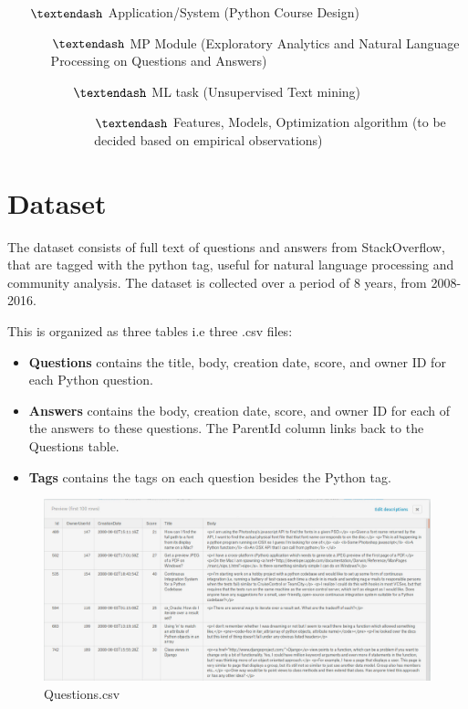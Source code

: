 \documentclass{article}
\begin{document}
\begin{itemize}
\item[$\textendash$] Application/System (Python Course Design)
\begin{itemize}
\item [$\textendash$] MP Module (Exploratory Analytics and Natural Language Processing on Questions and Answers)
\begin{itemize}
\item[$\textendash$] ML task (Unsupervised Text mining)
\begin{itemize}
\item[$\textendash$] Features, Models, Optimization algorithm (to be decided based on empirical observations)
\end{itemize}
\end{itemize}
\end{itemize}
\end{itemize}

\bigskip
\section{Dataset}
The dataset consists of full text of questions and answers from StackOverflow, that are tagged with the python tag, useful for natural language processing and community analysis. The dataset is collected over a period of 8 years, from 2008-2016. 

This is organized as three tables i.e three .csv files:

\begin{itemize}
\item \textbf{Questions} contains the title, body, creation date, score, and owner ID for each Python question.

\item \textbf{Answers}  contains the body, creation date, score, and owner ID for each of the answers to these questions. The ParentId column links back to the Questions table.

\item \textbf{Tags} contains the tags on each question besides the Python tag.
\end{itemize}

\newpage

\begin{figure}[h]
\centering
\includegraphics[width=12cm]{Questions}
\caption {Questions.csv}
\end{figure}
\end{document}
